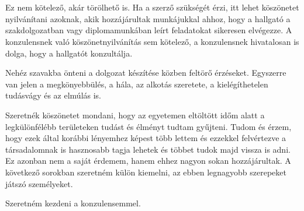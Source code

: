 \chapter*{\koszonetnyilvanitas}

Ez nem kötelező, akár törölhető is. Ha a szerző szükségét érzi, itt lehet köszönetet nyilvánítani azoknak, akik hozzájárultak munkájukkal ahhoz, hogy a hallgató a szakdolgozatban vagy diplomamunkában leírt feladatokat sikeresen elvégezze. A konzulensnek való köszönetnyilvánítás sem kötelező, a konzulensnek hivatalosan is dolga, hogy a hallgatót konzultálja.



Nehéz szavakba önteni a dolgozat készítése közben feltörő érzéseket.
Egyszerre van jelen a megkönyebbülés, a hála, az alkotás szeretete, a kielégíthetelen tudásvágy és az elmúlás is.

Szeretnék köszönetet mondani, hogy az egyetemen eltöltött időm alatt a legkülönfélébb területeken tudást és élményt tudtam gyűjteni.
Tudom és érzem, hogy ezek által korábbi lényemhez képest több lettem és ezzekkel felvértezve a társadalomnak is hasznosabb tagja lehetek és többet tudok majd vissza is adni.
Ez azonban nem a saját érdemem, hanem ehhez nagyon sokan hozzájárultak.
A következő sorokban szeretném külön kiemelni, az ebben legnagyobb szerepeket játszó személyeket.

Szeretném kezdeni a konzulensemmel. 